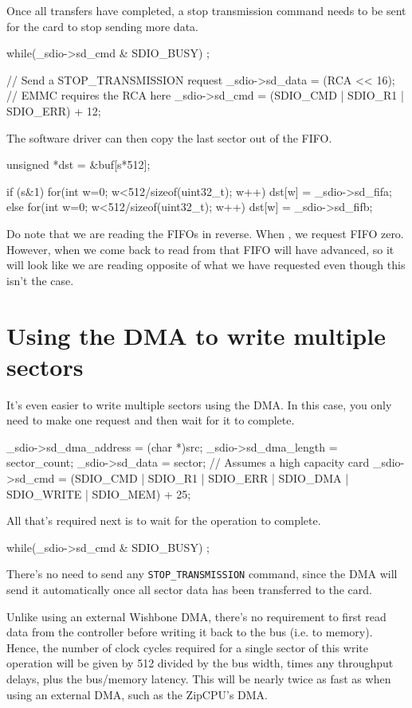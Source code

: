 \documentclass{gqtekspec}
\begin{document}
Once all transfers have completed, a stop transmission command needs to be
sent for the card to stop sending more data.

\begin{zCpp}
	while(_sdio->sd_cmd & SDIO_BUSY)
		;

	// Send a STOP_TRANSMISSION request
	_sdio->sd_data = (RCA << 16);	// EMMC requires the RCA here
	_sdio->sd_cmd = (SDIO_CMD | SDIO_R1 | SDIO_ERR) + 12;
\end{zCpp}

The software driver can then copy the last sector out of the FIFO.

\begin{zCpp}
	unsigned *dst = &buf[s*512];

	if (s&1) {
		for(int w=0; w<512/sizeof(uint32_t); w++)
			dst[w] = _sdio->sd_fifa;
	} else {
		for(int w=0; w<512/sizeof(uint32_t); w++)
			dst[w] = _sdio->sd_fifb;
	}
\end{zCpp}

Do note that we are reading the FIFOs in reverse.  When ,
we request FIFO zero.  However, when we come back to read from that FIFO
 will have advanced, so it will look like we are reading opposite
of what we have requested even though this isn't the case.
\section{Using the DMA to write multiple sectors}
It's even easier to write multiple sectors using the DMA.  In this case,
you only need to make one request and then wait for it to complete.

\begin{zCpp}
	_sdio->sd_dma_address = (char *)src;
	_sdio->sd_dma_length = sector_count;
	_sdio->sd_data = sector;	// Assumes a high capacity card
	_sdio->sd_cmd  = (SDIO_CMD | SDIO_R1 | SDIO_ERR | SDIO_DMA
				| SDIO_WRITE | SDIO_MEM) + 25;
\end{zCpp}

All that's required next is to wait for the operation to complete.

\begin{zCpp}
	while(_sdio->sd_cmd & SDIO_BUSY)
		;
\end{zCpp}

There's no need to send any {\tt STOP\_TRANSMISSION} command, since the DMA
will send it automatically once all sector data has been transferred to the
card.

Unlike using an external Wishbone DMA, there's no requirement to first read
data from the controller before writing it back to the bus (i.e. to memory).
Hence, the number of clock cycles required for a single sector of this write
operation will be given by 512 divided by the bus width, times any throughput
delays, plus the bus/memory latency.  This will be nearly twice as fast as
when using an external DMA, such as the ZipCPU's DMA.
\end{document}
